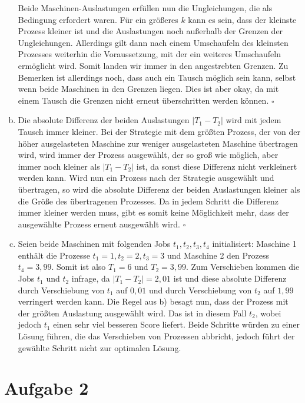 \documentclass[12pt,a4paper]{article}
\begin{document}
\begin{enumerate}[a)]
		Beide Maschinen-Auslastungen erfüllen nun die Ungleichungen, die als Bedingung erfordert waren. Für ein größeres $k$ kann es sein, dass der kleinste Prozess kleiner ist und die Auslastungen noch außerhalb der Grenzen der Ungleichungen. Allerdings gilt dann nach einem Umschaufeln des kleinsten Prozesses weiterhin die Voraussetzung, mit der ein weiteres Umschaufeln ermöglicht wird. Somit landen wir immer in den angestrebten Grenzen. Zu Bemerken ist allerdings noch, dass auch ein Tausch möglich sein kann, selbst wenn beide Maschinen in den Grenzen liegen. Dies ist aber okay, da mit einem Tausch die Grenzen nicht erneut überschritten werden können. $\square$

	\item Die absolute Differenz der beiden Auslastungen $|T_1 - T_2|$ wird mit jedem Tausch immer kleiner. Bei der Strategie mit dem größten Prozess, der von der höher ausgelasteten Maschine zur weniger ausgelasteten Maschine übertragen wird, wird immer der Prozess ausgewählt, der so groß wie möglich, aber immer noch kleiner als $|T_1 - T_2|$ ist, da sonst diese Differenz nicht verkleinert werden kann. Wird nun ein Prozess nach der Strategie ausgewählt und übertragen, so wird die absolute Differenz der beiden Auslastungen kleiner als die Größe des übertragenen Prozesses. Da in jedem Schritt die Differenz immer kleiner werden muss, gibt es somit keine Möglichkeit mehr, dass der ausgewählte Prozess erneut ausgewählt wird. $\square$
		
	\item Seien beide Maschinen mit folgenden Jobs $t_1, t_2, t_3, t_4$ initialisiert: Maschine 1 enthält die Prozesse $t_1 = 1, t_2 = 2, t_3 = 3$ und Maschine 2 den Prozess $t_4 = 3,99$. Somit ist also $T_1 = 6$ und $T_2 = 3,99$. Zum Verschieben kommen die Jobs $t_1$ und $t_2$ infrage, da $|T_1 - T_2| = 2,01$ ist und diese absolute Differenz durch Verschiebung von $t_1$ auf $0,01$ und durch Verschiebung von $t_2$ auf $1,99$ verringert werden kann. Die Regel aus b) besagt nun, dass der Prozess mit der größten Auslastung ausgewählt wird. Das ist in diesem Fall $t_2$, wobei jedoch $t_1$ einen sehr viel besseren Score liefert. Beide Schritte würden zu einer Lösung führen, die das Verschieben von Prozessen abbricht, jedoch führt der gewählte Schritt nicht zur optimalen Lösung.
		
\end{enumerate}



\section*{Aufgabe 2}
\end{document}
